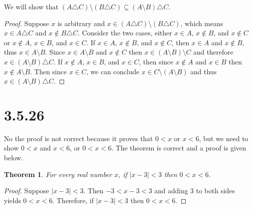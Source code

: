 \documentclass{article}
\newtheorem*{theorem}{Theorem}  %
\begin{document}
We will show that $(A \triangle C) \setminus (B \triangle C) \subseteq (A \setminus B) \triangle C$.
\begin{proof}
Suppose $x$ is arbitrary and $x \in (A \triangle C) \setminus (B \triangle C)$, which means $x \in A \triangle C$ and $x \notin B \triangle C$. Consider the two cases, either $x \in A$, $x \notin B$, and $x \notin C$ or $x \notin A$, $x \in B$, and $x \in C$. If $x \in A$, $x \notin B$, and $x \notin C$, then $x \in A$ and $x \notin B$, thus $x \in A \setminus B$. Since $x \in A \setminus B$ and $x \notin C$ then $x \in (A \setminus B) \setminus C$ and therefore $x \in (A \setminus B) \triangle C$. If $x \notin A$, $x \in B$, and $x \in C$, then since $x \notin A$ and $x \in B$ then $x \notin A \setminus B$. Then since $x \in C$, we can conclude $x \in C \setminus (A \setminus B)$ and thus $x \in (A \setminus B) \triangle C$.
\end{proof}

\section*{3.5.26}
No the proof is not correct because it proves that $0 < x$ or $x < 6$, but we need to show $0 < x$ and $x < 6$, or $0 < x < 6$. The theorem is correct and a proof is given below.

\begin{theorem}  For every real number $x$, if $|x - 3| < 3$ then $0 < x < 6$.
\end{theorem}

\begin{proof}
Suppose $|x-3| < 3$. Then $-3 < x - 3 < 3$ and adding 3 to both sides yields $0 < x < 6$. Therefore, if $|x - 3| < 3$ then $0 < x < 6$.
\end{proof}
\end{document}
